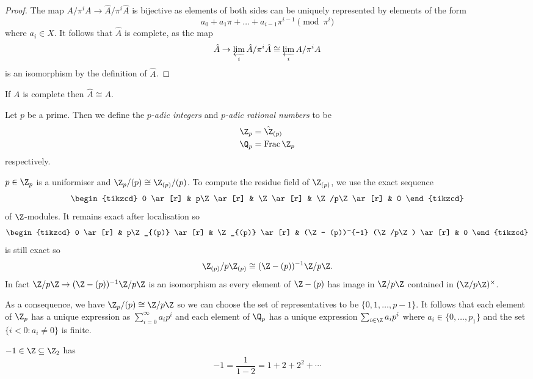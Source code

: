 \documentclass[a4paper]{article}
\DeclareMathOperator{\Frac}{Frac}
\begin{document}
\begin{proof}
  The map \(A/\pi^i A \to \hat A/ \pi^i \hat A\) is bijective as elements of both sides can be uniquely represented by elements of the form
  \[
    a_0 + a_1 \pi + \dots + a_{i - 1}\pi^{i - 1} \pmod{\pi^i}
  \]
  where \(a_i \in X\). It follows that \(\hat A\) is complete, as the map
  \[
    \hat A \to \varprojlim_i \hat A/\pi^i \hat A \cong \varprojlim_i A/\pi^i A
  \]
  is an isomorphism by the definition of \(\hat A\).
\end{proof}

\begin{remark}
  If \(A\) is complete then \(\hat A \cong A\).
\end{remark}

\begin{definition}
  Let \(p\) be a prime. Then we define the \emph{\(p\)-adic integers} and \emph{\(p\)-adic rational numbers} to be
  \begin{align*}
    \Z_p &= \hat \Z_{(p)} \\
    \Q_p &= \Frac \Z_p
  \end{align*}
  respectively.
\end{definition}

\(p \in \Z_p\) is a uniformiser and \(\Z_p/(p) \cong \Z_{(p)}/(p)\). To compute the residue field of \(\Z_{(p)}\), we use the exact sequence
\[
  \begin{tikzcd}
    0 \ar[r] & p\Z \ar[r] & \Z \ar[r] & \Z/p\Z \ar[r] & 0
  \end{tikzcd}
\]
of \(\Z\)-modules. It remains exact after localisation so
\[
  \begin{tikzcd}
    0 \ar[r] & p\Z_{(p)} \ar[r] & \Z_{(p)} \ar[r] & (\Z - (p))^{-1} (\Z/p\Z) \ar[r] & 0
  \end{tikzcd}
\]
is still exact so
\[
  \Z_{(p)}/p\Z_{(p)} \cong (\Z - (p))^{-1}\Z/p\Z.
\]
In fact \(\Z/p\Z \to (\Z - (p))^{-1} \Z/p\Z\) is an isomorphism as every element of \(\Z - (p)\) has image in \(\Z/p\Z\) contained in \((\Z/p\Z)^\times\).

As a consequence, we have \(\Z_p/(p) \cong \Z/p\Z\) so we can choose the set of representatives to be \(\{0, 1, \dots, p- 1\}\). It follows that each element of \(\Z_p\) has a unique expression as \(\sum_{i = 0}^\infty a_i p^i\) and each element of \(\Q_p\) has a unique expression \(\sum_{i \in \Z} a_i p^i\) where \(a_i \in \{0, \dots, p_1\}\) and the set \(\{i < 0: a_i \neq 0\}\) is finite.

\begin{eg}
  \(-1 \in \Z \subseteq \Z_2\) has
  \[
    -1 = \frac{1}{1 - 2} = 1 + 2 + 2^2 + \cdots
  \]
\end{eg}


\printindex
\end{document}
